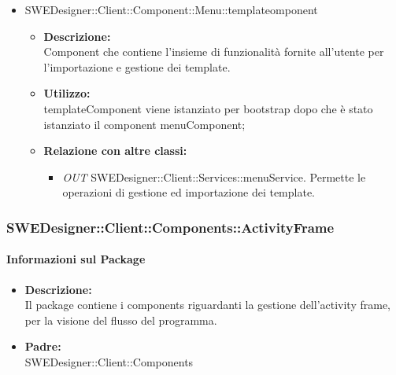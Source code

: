 \begin{itemize}
\begin{itemize}
\item SWEDesigner::Client::Component::Menu::templateomponent		
		\begin{itemize}
			\item \textbf{Descrizione:}\\
			Component che contiene l'insieme di funzionalità fornite all'utente per l'importazione e gestione dei template.
			\item \textbf{Utilizzo:}\\
			templateComponent viene istanziato per bootstrap dopo che è stato istanziato il component menuComponent;
			\item \textbf{Relazione con altre classi:}\\
			\begin{itemize}
			\item \emph{OUT} SWEDesigner::Client::Services::menuService. Permette le operazioni di gestione ed importazione dei template.
			\end{itemize}
		\end{itemize}		
		\end{itemize}	
		

\subsubsection{SWEDesigner::Client::Components::ActivityFrame}
		 
		\paragraph{Informazioni sul Package}
		\begin{itemize}
			\item \textbf{Descrizione: }\\
			Il package contiene i components riguardanti la gestione dell'activity frame, per la visione del flusso del programma.
			\item \textbf{Padre: }\\ SWEDesigner::Client::Components
		\end{itemize}


\end{itemize}
